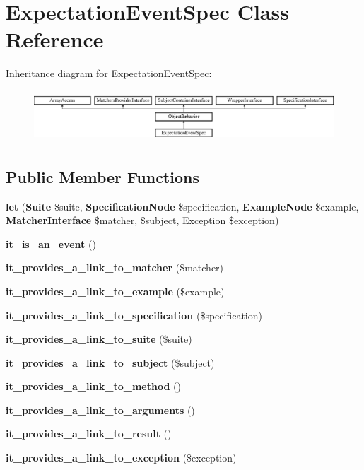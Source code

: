 \section{Expectation\+Event\+Spec Class Reference}
\label{classspec_1_1_php_spec_1_1_event_1_1_expectation_event_spec}
Inheritance diagram for Expectation\+Event\+Spec\+:\begin{figure}[H]
\begin{center}
\leavevmode
\includegraphics[height=1.953488cm]{classspec_1_1_php_spec_1_1_event_1_1_expectation_event_spec}
\end{center}
\end{figure}
\subsection*{Public Member Functions}
\begin{DoxyCompactItemize}
\item 
{\bf let} ({\bf Suite} \$suite, {\bf Specification\+Node} \$specification, {\bf Example\+Node} \$example, {\bf Matcher\+Interface} \$matcher, \$subject, Exception \$exception)
\item 
{\bf it\+\_\+is\+\_\+an\+\_\+event} ()
\item 
{\bf it\+\_\+provides\+\_\+a\+\_\+link\+\_\+to\+\_\+matcher} (\$matcher)
\item 
{\bf it\+\_\+provides\+\_\+a\+\_\+link\+\_\+to\+\_\+example} (\$example)
\item 
{\bf it\+\_\+provides\+\_\+a\+\_\+link\+\_\+to\+\_\+specification} (\$specification)
\item 
{\bf it\+\_\+provides\+\_\+a\+\_\+link\+\_\+to\+\_\+suite} (\$suite)
\item 
{\bf it\+\_\+provides\+\_\+a\+\_\+link\+\_\+to\+\_\+subject} (\$subject)
\item 
{\bf it\+\_\+provides\+\_\+a\+\_\+link\+\_\+to\+\_\+method} ()
\item 
{\bf it\+\_\+provides\+\_\+a\+\_\+link\+\_\+to\+\_\+arguments} ()
\item 
{\bf it\+\_\+provides\+\_\+a\+\_\+link\+\_\+to\+\_\+result} ()
\item 
{\bf it\+\_\+provides\+\_\+a\+\_\+link\+\_\+to\+\_\+exception} (\$exception)
\end{DoxyCompactItemize}
